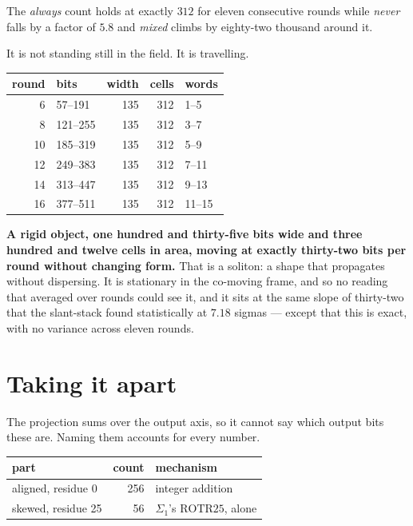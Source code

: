 The \emph{always} count holds at exactly \(312\) for eleven consecutive rounds while \emph{never}
falls by a factor of \(5.8\) and \emph{mixed} climbs by eighty-two thousand around it.

It is not standing still in the field. It is travelling.

\begin{center}
\begin{tabular}{rlrrl}
\toprule
round & bits & width & cells & words \\
\midrule
6 & 57--191 & 135 & 312 & 1--5 \\
8 & 121--255 & 135 & 312 & 3--7 \\
10 & 185--319 & 135 & 312 & 5--9 \\
12 & 249--383 & 135 & 312 & 7--11 \\
14 & 313--447 & 135 & 312 & 9--13 \\
16 & 377--511 & 135 & 312 & 11--15 \\
\bottomrule
\end{tabular}
\end{center}

\textbf{A rigid object, one hundred and thirty-five bits wide and three hundred and twelve cells in
area, moving at exactly thirty-two bits per round without changing form.} That is a soliton: a shape
that propagates without dispersing. It is stationary in the co-moving frame, and so no reading
that averaged over rounds could see it, and it sits at the same slope of thirty-two that the
slant-stack found statistically at \(7.18\) sigmas --- except that this is exact, with no variance
across eleven rounds.

\section{Taking it apart}

The projection sums over the output axis, so it cannot say which output bits these are. Naming them
accounts for every number.

\begin{center}
\begin{tabular}{lrl}
\toprule
part & count & mechanism \\
\midrule
aligned, residue 0 & 256 & integer addition \\
skewed, residue 25 & 56 & \(\Sigma_1\)'s \(\mathrm{ROTR}25\), alone \\
\bottomrule
\end{tabular}
\end{center}


